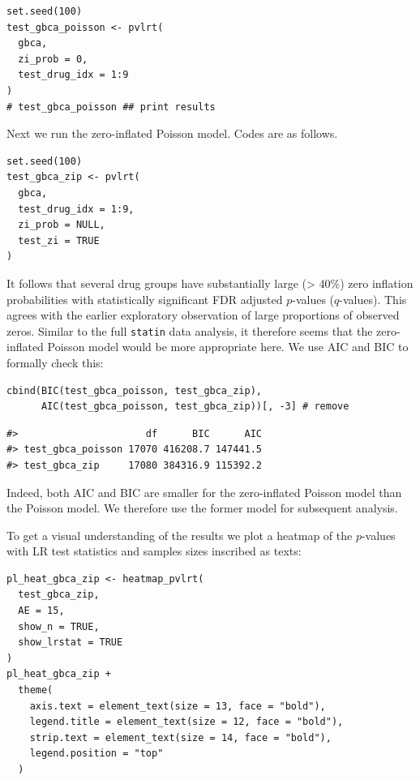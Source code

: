 \begin{verbatim}
set.seed(100)
test_gbca_poisson <- pvlrt(
  gbca,
  zi_prob = 0,
  test_drug_idx = 1:9
)
# test_gbca_poisson ## print results
\end{verbatim}

\noindent Next we run the zero-inflated Poisson model. Codes are as follows.

\begin{verbatim}
set.seed(100)
test_gbca_zip <- pvlrt(
  gbca,
  test_drug_idx = 1:9,
  zi_prob = NULL,
  test_zi = TRUE
)
\end{verbatim}

\noindent It follows that several drug groups have substantially large (\textgreater{} 40\%) zero inflation probabilities with statistically significant FDR adjusted \(p\)-values (\(q\)-values). This agrees with the earlier exploratory observation of large proportions of observed zeros. Similar to the full \texttt{statin} data analysis, it therefore seems that the zero-inflated Poisson model would be more appropriate here. We use AIC and BIC to formally check this:

\begin{verbatim}
cbind(BIC(test_gbca_poisson, test_gbca_zip),
      AIC(test_gbca_poisson, test_gbca_zip))[, -3] # remove 
\end{verbatim}

\begin{verbatim}
#>                      df      BIC      AIC
#> test_gbca_poisson 17070 416208.7 147441.5
#> test_gbca_zip     17080 384316.9 115392.2
\end{verbatim}

\noindent Indeed, both AIC and BIC are smaller for the zero-inflated Poisson model than the Poisson model. We therefore use the former model for subsequent analysis.

To get a visual understanding of the results we plot a heatmap of the \(p\)-values with LR test statistics and samples sizes inscribed as texts:

\begin{verbatim}
pl_heat_gbca_zip <- heatmap_pvlrt(
  test_gbca_zip,
  AE = 15,
  show_n = TRUE,
  show_lrstat = TRUE
) 
pl_heat_gbca_zip +
  theme(
    axis.text = element_text(size = 13, face = "bold"),
    legend.title = element_text(size = 12, face = "bold"),
    strip.text = element_text(size = 14, face = "bold"),
    legend.position = "top"
  )
\end{verbatim}

